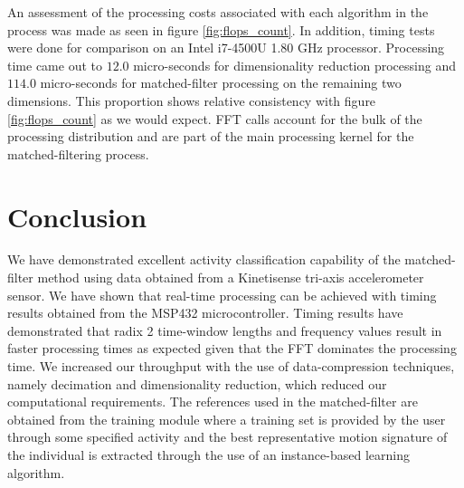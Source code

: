\documentclass[journal]{IEEEtran}
\begin{document}
An assessment of the processing costs associated with each algorithm in the process was made as seen in figure \ref{fig:flops_count}.
In addition, timing tests were done for comparison on an Intel i7-4500U 1.80 GHz processor.
Processing time came out to $12.0$ micro-seconds for dimensionality reduction processing and $114.0$ micro-seconds for matched-filter processing on the remaining two dimensions.
This proportion shows relative consistency with figure \ref{fig:flops_count} as we would expect.
FFT calls account for the bulk of the processing distribution and are part of the main processing kernel for the matched-filtering process.
%
\section{Conclusion}
We have demonstrated excellent activity classification capability of the matched-filter method using data obtained from a Kinetisense tri-axis accelerometer sensor.
We have shown that real-time processing can be achieved with timing results obtained from the MSP432 microcontroller.
Timing results have demonstrated that radix 2 time-window lengths and frequency values result in faster processing times as expected given that the FFT dominates the processing time.
We increased our throughput with the use of data-compression techniques, namely decimation and dimensionality reduction, which reduced our computational requirements.
The references used in the matched-filter are obtained from the training module where a training set is provided by the user through some specified activity and the best representative motion signature of the individual is extracted through the use of an instance-based learning algorithm.

%
\appendices
%
\ifCLASSOPTIONcaptionsoff
  \newpage
\fi
%


\end{document}
